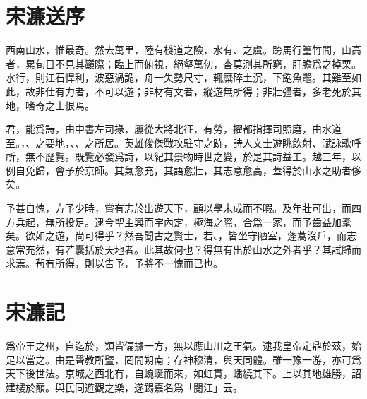 
\section[送天台陳庭學序\quad{\small 宋濂}]{{\normalsize 宋濂}\quad 送序}
西南山水，惟最奇。然去萬里，陸有棧道之險，水有、之虞。跨馬行{篁}竹間，山高者，累旬日不見其巓際；臨上而俯視，絕壑萬仞，杳莫測其所窮，肝膽爲之掉栗。水行，則江石悍利，波惡渦詭，舟一失{勢}尺寸，輒糜碎土沉，下飽魚鼈。其難至如此，故非仕有力者，不可以遊；非材有文者，縱遊無所得；非壯彊者，多老死於其地，嗜奇之士恨焉。

君，能爲詩，由中書左司掾，屢從大將北征，有勞，擢都指揮司照磨，由水道至。，、之要地，、、之所居。英雄俊傑戰攻駐守之跡，詩人文士遊眺飲射、賦詠歌呼所，無不歷覽。既覽必發爲詩，以紀其景物時世之變，於是其詩益工。越三年，以例自免歸，會予於京師。其氣愈充，其語愈壯，其志意愈高，蓋得於山水之助者侈矣。

予甚自愧，方予少時，嘗有志於出遊天下，顧以學未成而不暇。及年壯可出，而四方兵起，無所投足。逮今聖主興而宇內定，極海之際，合爲一家，而予齒益加耄矣。欲如之遊，尚可得乎？然吾聞古之賢士，若、，皆坐守陋室，蓬蒿沒戶，而志意常充然，有若囊括於天地者。此其故何也？得無有出於山水之外者乎？其試歸而求焉。茍有所得，則以告予，予將不一愧而已也。 

\theendnotes 

\section[閲江樓記\quad{\small 宋濂}]{{\normalsize 宋濂}\quad {}記}
爲帝王之州，自迄於，類皆偏據一方，無以應山川之王氣。逮我皇帝定鼎於茲，始足以當之。由是聲教所暨，罔間朔南；存神穆清，與天同體。雖一豫一游，亦可爲天下後世法。京城之西北有，自蜿蜒而來，如虹貫，蟠繞其下。上以其地雄勝，詔建樓於巔。與民同遊觀之樂，遂錫嘉名爲「閱江」云。


